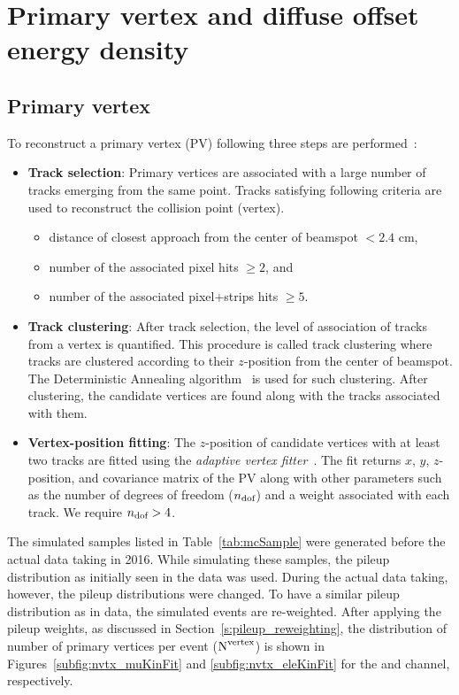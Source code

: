 \section{Primary vertex and diffuse offset energy density}
\subsection{Primary vertex}
\label{s:secPV}
    To reconstruct a primary vertex (PV) following three steps are performed~\cite{Chatrchyan:2014fea}:
    \begin{itemize}[leftmargin=*]
        \item {\bf{ Track selection}}: Primary vertices are associated with a large number of tracks
            emerging from the same point. Tracks satisfying following criteria are used to reconstruct the collision point (vertex). 
           \begin{itemize}[leftmargin=*]
               \item distance of closest approach from the center of beamspot $< 2.4$ \unit{cm},
               \item number of the associated pixel hits $\geq 2$, and
               \item number of the associated pixel+strips hits $\geq 5$.
           \end{itemize}
      \item {\bf{ Track clustering}}: After track selection, the level of association of tracks 
	from a vertex is quantified. This procedure is called track clustering where tracks are 
	clustered according to their $z$-position from the center of beamspot. The Deterministic 
	Annealing algorithm~\cite{an-11-014, 726788} is used for such clustering. After clustering, 
	the candidate vertices are found along with the tracks associated with them.
      \item {\bf{ Vertex-position fitting}}: The $z$-position of candidate vertices with at least two 
	tracks are fitted using the {\em adaptive vertex fitter}~\cite{Fruhwirth:1027031}. The fit 
	returns $x$, $y$, $z$-position, and covariance matrix of the PV along with other parameters 
	such as the number of degrees of freedom ($n_{\rm {dof}}$) and a weight associated with each 
	track. We require $n_{\rm {dof}} > 4$.
   \end{itemize}

The simulated samples listed in Table~\ref{tab:mcSample} were generated before the actual data 
taking in 2016. While simulating these samples, the pileup distribution as initially seen in the 
data was used. During the actual data taking, however, the pileup distributions were changed.
To have a similar pileup distribution as in data, the simulated events are re-weighted.
After applying the pileup weights, as discussed in Section~\ref{s:pileup_reweighting}, the distribution of number of primary vertices per event 
($\rm{N}^{\text{vertex}}$) is shown in Figures~\ref{subfig:nvtx_muKinFit} and \ref{subfig:nvtx_eleKinFit} 
for the \mujets and \ejets channel, respectively.


